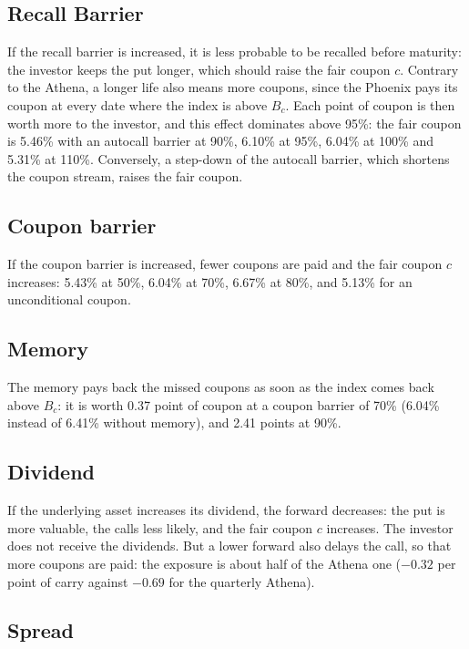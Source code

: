 \documentclass[11pt,a4paper]{article}
\begin{document}
\subsection*{Recall Barrier}

If the recall barrier is increased, it is less probable to be recalled before maturity: the investor keeps the put
longer, which should raise the fair coupon $c$. Contrary to the Athena, a longer life also means more coupons, since
the Phoenix pays its coupon at every date where the index is above $B_c$. Each point of coupon is then worth more to
the investor, and this effect dominates above 95\%: the fair coupon is 5.46\% with an autocall barrier at 90\%,
6.10\% at 95\%, 6.04\% at 100\% and 5.31\% at 110\%. Conversely, a step-down of the autocall barrier, which shortens
the coupon stream, raises the fair coupon.


\subsection*{Coupon barrier}

If the coupon barrier is increased, fewer coupons are paid and the fair coupon $c$ increases: 5.43\% at 50\%, 6.04\%
at 70\%, 6.67\% at 80\%, and 5.13\% for an unconditional coupon.


\subsection*{Memory}

The memory pays back the missed coupons as soon as the index comes back above $B_c$: it is worth 0.37 point of coupon
at a coupon barrier of 70\% (6.04\% instead of 6.41\% without memory), and 2.41 points at 90\%.


\subsection*{Dividend}

If the underlying asset increases its dividend, the forward decreases: the put is more valuable, the calls less
likely, and the fair coupon $c$ increases. The investor does not receive the dividends. But a lower forward also
delays the call, so that more coupons are paid: the exposure is about half of the Athena one ($-0.32$ per point of
carry against $-0.69$ for the quarterly Athena).


\subsection*{Spread}
\end{document}
